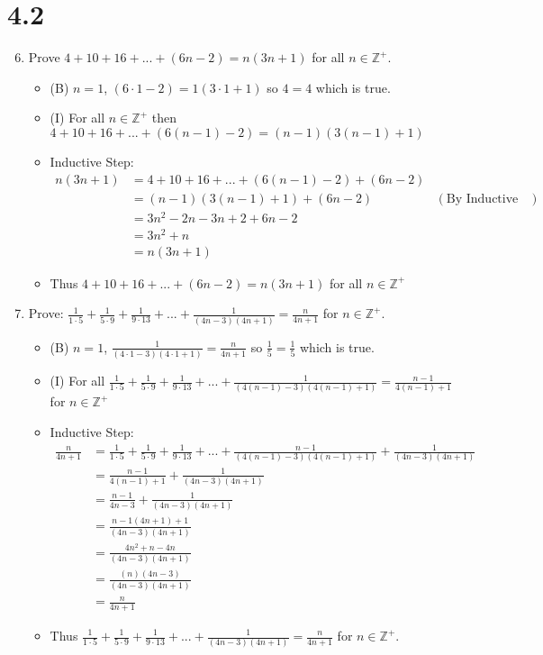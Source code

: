 \documentclass[12pt]{article}
\newcommand{\Z}{\mathbb{Z}}
\begin{document}
\section*{4.2}
\begin{enumerate}

\setcounter{enumi}{5}
\item Prove $4+10+16+...+(6n-2)=n(3n+1)$ for all $n\in\Z^+$.
	\begin{itemize}
	\item (B) $n=1$, $(6\cdot1-2)=1(3\cdot1+1)$ so $4=4$ which is true.
	\item (I)  For all $n\in\Z^+$ then $4+10+16+...+(6(n-1)-2)=(n-1)(3(n-1)+1)$
	\item Inductive Step:
		\begin{align*}
		n(3n+1) &= 4+10+16+...+(6(n-1)-2)+(6n-2)\\
		&= (n-1)(3(n-1)+1)+(6n-2) & (\text{By Inductive Hypothesis})\\
		&= 3n^2 - 2n - 3n + 2 + 6n - 2\\
		&= 3n^2+n\\
		&= n(3n+1)
		\end{align*}
	\item Thus $4+10+16+...+(6n-2)=n(3n+1)$ for all $n\in\Z^+$
	\end{itemize}

\setcounter{enumi}{7}
\item Prove: $\frac{1}{1\cdot5} + \frac{1}{5\cdot9} + \frac{1}{9\cdot13} + ... + 
\frac{1}{(4n-3)(4n+1)} = \frac{n}{4n+1}$ for $n\in\Z^+$.
	\begin{itemize}
	\item (B) $n=1$, $\frac{1}{(4\cdot1-3)(4\cdot1+1)} = \frac{n}{4n+1}$ so $\frac{1}{5}=\frac{1}{5}$ which 	is true.
	\item (I)  For all $\frac{1}{1\cdot5} + \frac{1}{5\cdot9} + \frac{1}{9\cdot13} + ... + 
		\frac{1}{(4(n-1)-3)(4(n-1)+1)} = \frac{n-1}{4(n-1)+1}$ for $n\in\Z^+$
	\item Inductive Step:
		\begin{align*}
		 \frac{n}{4n+1} &= 
		 \frac{1}{1\cdot5} + \frac{1}{5\cdot9} + \frac{1}{9\cdot13} + ... + \frac{n-1}{(4(n-1)-3)(4(n-1)+1)} + 
		 \frac{1}{(4n-3)(4n+1)}\\
		 &= \frac{n-1}{4(n-1)+1} + \frac{1}{(4n-3)(4n+1)}\\
		 &= \frac{n-1}{4n-3} + \frac{1}{(4n-3)(4n+1)}\\
		 &= \frac{n-1(4n+1)+1}{(4n-3)(4n+1)}\\
		 &= \frac{4n^2+n-4n}{(4n-3)(4n+1)}\\
		 &= \frac{(n)(4n-3)}{(4n-3)(4n+1)}\\
		  &= \frac{n}{4n+1}
		\end{align*}
	\item Thus $\frac{1}{1\cdot5} + \frac{1}{5\cdot9} + \frac{1}{9\cdot13} + ... +  \frac{1}{(4n-3)(4n+1)} = 		\frac{n}{4n+1}$ for $n\in\Z^+$.
	\end{itemize}


\end{enumerate}
\end{document}
